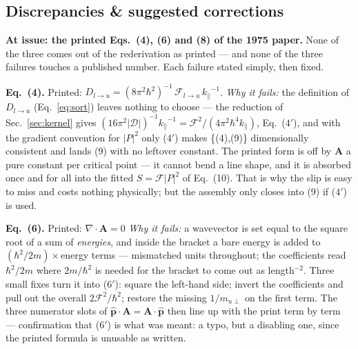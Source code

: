 \documentclass[11pt,a4paper]{article}
\numberwithin{equation}{section}
\begin{document}
\subsection{Discrepancies \& suggested corrections}\label{sec:grw}

\noindent\textbf{At issue: the printed Eqs.~(4), (6) and (8) of the
1975 paper.}  None of the three comes out of the rederivation as
printed --- and none of the three failures touches a published number.
Each failure stated simply, then fixed.

\medskip
\textbf{Eq.\ (4).}  Printed:
${D_{l\to u}}=(8\pi^2\hbar^2)^{-1}\,{\mathcal{F}}_{l\to u}\,{k_{\parallel}}^{-1}$.
\emph{Why it fails:} the definition of ${D_{l\to u}}$ (Eq.~\eqref{eq:sort})
leaves nothing to choose --- the reduction of
Sec.~\ref{sec:kernel} gives $(16\pi^2|{\mathcal{D}}|)^{-1}{k_{\parallel}}^{-1}
={\mathcal{F}}^2/(4\pi^2\hbar^4{k_{\parallel}})$, Eq.~($4'$), and with the gradient
convention for $|P|^2$ only ($4'$) makes \{(4),(9)\} dimensionally
consistent and lands (9) with no leftover constant.  The printed form
is off by
$\mathbf{A}$
a pure constant per critical point --- it cannot bend a line shape,
and it is absorbed once and for all into the fitted $S={\mathcal{F}}|P|^2$ of
Eq.~(10).  That is why the slip is easy to miss and costs nothing
physically; but the assembly only closes into (9) if ($4'$) is used.

\medskip
\textbf{Eq.\ (6).}  Printed:
$\nabla\!\cdot\!\mathbf{A}=0$
\emph{Why it fails:} a wavevector is set equal to the square root of a
sum of \emph{energies}, and inside the bracket a bare energy is added
to $(\hbar^2/2m)\times$energy terms --- mismatched units throughout;
the coefficients read $\hbar^2/2m$ where $2m/\hbar^2$ is needed for
the bracket to come out as length$^{-2}$.  Three small fixes turn it
into ($6'$): square the left-hand side; invert the coefficients and
pull out the overall $2{\mathcal{F}}^2/\hbar^2$; restore the missing
$1/m_{u\perp}$ on the first term.  The three numerator slots of
$\hat{\mathbf p}\!\cdot\!\mathbf A
=\mathbf A\!\cdot\!\hat{\mathbf p}$
then line up with the print term by term --- confirmation that ($6'$)
is what was meant: a typo, but a disabling one, since the printed
formula is unusable as written.
\end{document}
